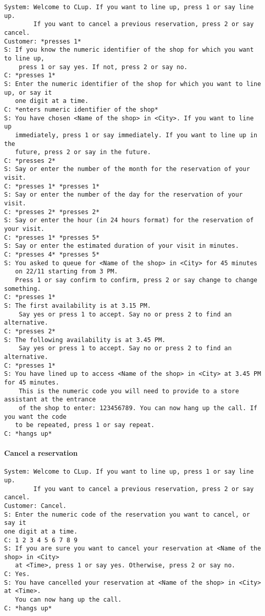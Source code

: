 \documentclass[../../main.tex]{subfiles}
\begin{document}
\begin{verbatim}
System: Welcome to CLup. If you want to line up, press 1 or say line up.
        If you want to cancel a previous reservation, press 2 or say cancel.
Customer: *presses 1*
S: If you know the numeric identifier of the shop for which you want to line up,
    press 1 or say yes. If not, press 2 or say no.
C: *presses 1*
S: Enter the numeric identifier of the shop for which you want to line up, or say it
   one digit at a time.
C: *enters numeric identifier of the shop*
S: You have chosen <Name of the shop> in <City>. If you want to line up
   immediately, press 1 or say immediately. If you want to line up in the
   future, press 2 or say in the future.
C: *presses 2*
S: Say or enter the number of the month for the reservation of your visit.
C: *presses 1* *presses 1*
S: Say or enter the number of the day for the reservation of your visit.
C: *presses 2* *presses 2*
S: Say or enter the hour (in 24 hours format) for the reservation of your visit.
C: *presses 1* *presses 5*
S: Say or enter the estimated duration of your visit in minutes.
C: *presses 4* *presses 5*
S: You asked to queue for <Name of the shop> in <City> for 45 minutes
   on 22/11 starting from 3 PM.
   Press 1 or say confirm to confirm, press 2 or say change to change something.
C: *presses 1*
S: The first availability is at 3.15 PM.
    Say yes or press 1 to accept. Say no or press 2 to find an alternative.
C: *presses 2*
S: The following availability is at 3.45 PM.
    Say yes or press 1 to accept. Say no or press 2 to find an alternative.
C: *presses 1*
S: You have lined up to access <Name of the shop> in <City> at 3.45 PM for 45 minutes.
    This is the numeric code you will need to provide to a store assistant at the entrance
    of the shop to enter: 123456789. You can now hang up the call. If you want the code
   to be repeated, press 1 or say repeat.
C: *hangs up*
\end{verbatim}

\paragraph{Cancel a reservation}

\begin{verbatim}
System: Welcome to CLup. If you want to line up, press 1 or say line up.
        If you want to cancel a previous reservation, press 2 or say cancel.
Customer: Cancel.
S: Enter the numeric code of the reservation you want to cancel, or say it
one digit at a time.
C: 1 2 3 4 5 6 7 8 9
S: If you are sure you want to cancel your reservation at <Name of the shop> in <City>
   at <Time>, press 1 or say yes. Otherwise, press 2 or say no.
C: Yes.
S: You have cancelled your reservation at <Name of the shop> in <City> at <Time>.
   You can now hang up the call.
C: *hangs up*
\end{verbatim}
\end{document}
